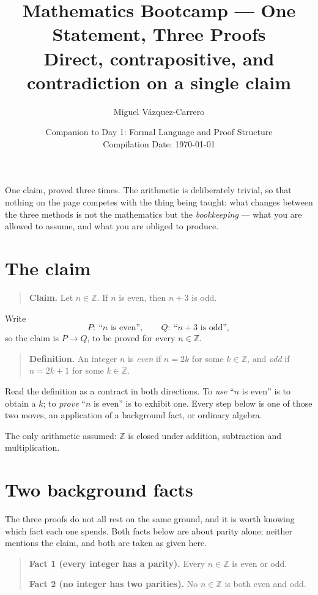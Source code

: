 \documentclass[12pt]{article}
\title{\textbf{Mathematics Bootcamp --- One Statement, Three Proofs}\\[.4em]
       \large Direct, contrapositive, and contradiction on a single claim}
\author{Miguel V\'azquez-Carrero}
\date{Companion to Day 1: Formal Language and Proof Structure\\[.3em]
      \normalsize Compilation Date: \today}
\begin{document}
\maketitle

\noindent
One claim, proved three times. The arithmetic is deliberately trivial, so that
nothing on the page competes with the thing being taught: what changes between
the three methods is not the mathematics but the \emph{bookkeeping} --- what you
are allowed to assume, and what you are obliged to produce.

\section*{The claim}

\begin{quote}
\textbf{Claim.} Let $n\in\mathbb{Z}$. If $n$ is even, then $n+3$ is odd.
\end{quote}

\noindent
Write
\[
P:\ \text{``$n$ is even''},\qquad Q:\ \text{``$n+3$ is odd''},
\]
so the claim is $P\rightarrow Q$, to be proved for every $n\in\mathbb{Z}$.

\begin{quote}
\textbf{Definition.}
An integer $n$ is \emph{even} if $n=2k$ for some $k\in\mathbb{Z}$, and
\emph{odd} if $n=2k+1$ for some $k\in\mathbb{Z}$.
\end{quote}

\noindent
Read the definition as a contract in both directions. To \emph{use} ``$n$ is
even'' is to obtain a $k$; to \emph{prove} ``$n$ is even'' is to exhibit one.
Every step below is one of those two moves, an application of a background fact,
or ordinary algebra.

The only arithmetic assumed: $\mathbb{Z}$ is closed under addition, subtraction
and multiplication.

\section*{Two background facts}

The three proofs do not all rest on the same ground, and it is worth knowing
which fact each one spends. Both facts below are about parity alone; neither
mentions the claim, and both are taken as given here.

\begin{quote}
\textbf{Fact 1 (every integer has a parity).}
Every $n\in\mathbb{Z}$ is even or odd.

\medskip
\textbf{Fact 2 (no integer has two parities).}
No $n\in\mathbb{Z}$ is both even and odd.
\end{quote}
\end{document}

